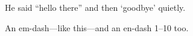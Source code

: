 He said ``hello there'' and then `goodbye' quietly.

An em-dash---like this---and an en-dash 1--10 too.
